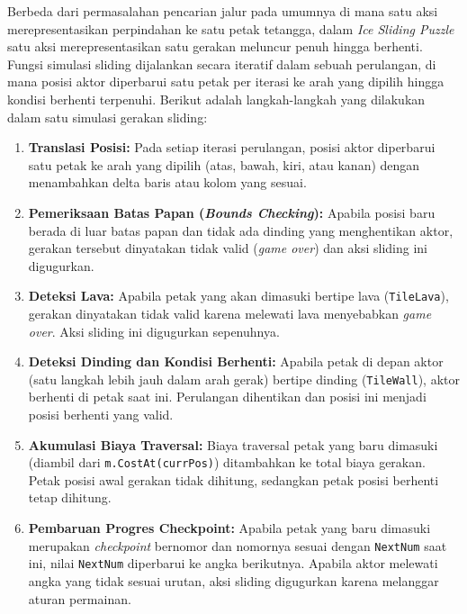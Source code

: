 \documentclass[12pt,a4paper]{article}
\begin{document}
Berbeda dari permasalahan pencarian jalur pada umumnya di mana satu aksi
merepresentasikan perpindahan ke satu petak tetangga, dalam \textit{Ice Sliding
Puzzle} satu aksi merepresentasikan satu gerakan meluncur penuh hingga berhenti.
Fungsi simulasi sliding dijalankan secara iteratif dalam sebuah perulangan, di mana
posisi aktor diperbarui satu petak per iterasi ke arah yang dipilih hingga kondisi
berhenti terpenuhi. Berikut adalah langkah-langkah yang dilakukan dalam satu
simulasi gerakan sliding:

\begin{enumerate}
    \item \textbf{Translasi Posisi:} Pada setiap iterasi perulangan, posisi aktor
    diperbarui satu petak ke arah yang dipilih (atas, bawah, kiri, atau kanan)
    dengan menambahkan delta baris atau kolom yang sesuai.

    \item \textbf{Pemeriksaan Batas Papan (\textit{Bounds Checking}):} Apabila
    posisi baru berada di luar batas papan dan tidak ada dinding yang menghentikan
    aktor, gerakan tersebut dinyatakan tidak valid (\textit{game over}) dan aksi
    sliding ini digugurkan.

    \item \textbf{Deteksi Lava:} Apabila petak yang akan dimasuki bertipe lava
    (\texttt{TileLava}), gerakan dinyatakan tidak valid karena melewati lava
    menyebabkan \textit{game over}. Aksi sliding ini digugurkan sepenuhnya.

    \item \textbf{Deteksi Dinding dan Kondisi Berhenti:} Apabila petak di depan
    aktor (satu langkah lebih jauh dalam arah gerak) bertipe dinding
    (\texttt{TileWall}), aktor berhenti di petak saat ini. Perulangan dihentikan
    dan posisi ini menjadi posisi berhenti yang valid.

    \item \textbf{Akumulasi Biaya Traversal:} Biaya traversal petak yang baru
    dimasuki (diambil dari \texttt{m.CostAt(currPos)}) ditambahkan ke total biaya
    gerakan. Petak posisi awal gerakan tidak dihitung, sedangkan petak posisi
    berhenti tetap dihitung.

    \item \textbf{Pembaruan Progres Checkpoint:} Apabila petak yang baru dimasuki
    merupakan \textit{checkpoint} bernomor dan nomornya sesuai dengan \texttt{NextNum}
    saat ini, nilai \texttt{NextNum} diperbarui ke angka berikutnya. Apabila aktor
    melewati angka yang tidak sesuai urutan, aksi sliding digugurkan karena melanggar
    aturan permainan.
\end{enumerate}
\end{document}
